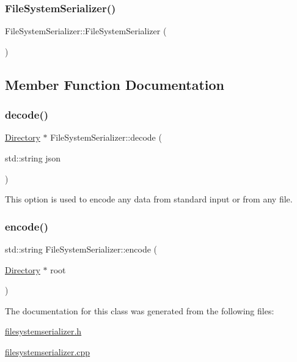 \subsubsection{\texorpdfstring{File\+System\+Serializer()}{FileSystemSerializer()}}
{\footnotesize\ttfamily File\+System\+Serializer\+::\+File\+System\+Serializer (\begin{DoxyParamCaption}{ }\end{DoxyParamCaption})}



\subsection{Member Function Documentation}
\mbox{\label{class_file_system_serializer_a9a32306fcb9133696c1b5f795eaa1933}} 
\subsubsection{\texorpdfstring{decode()}{decode()}}
{\footnotesize\ttfamily \hyperlink{class_directory}{Directory} $\ast$ File\+System\+Serializer\+::decode (\begin{DoxyParamCaption}\item[{std\+::string}]{json }\end{DoxyParamCaption})\hspace{0.3cm}{\ttfamily [static]}}

This option is used to encode any data from standard input or from any file. \mbox{\label{class_file_system_serializer_aef096d9b5936bddd4beac3dc9181c28f}} 
\subsubsection{\texorpdfstring{encode()}{encode()}}
{\footnotesize\ttfamily std\+::string File\+System\+Serializer\+::encode (\begin{DoxyParamCaption}\item[{\hyperlink{class_directory}{Directory} $\ast$}]{root }\end{DoxyParamCaption})\hspace{0.3cm}{\ttfamily [static]}}



The documentation for this class was generated from the following files\+:\begin{DoxyCompactItemize}
\item 
\hyperlink{filesystemserializer_8h}{filesystemserializer.\+h}\item 
\hyperlink{filesystemserializer_8cpp}{filesystemserializer.\+cpp}\end{DoxyCompactItemize}
